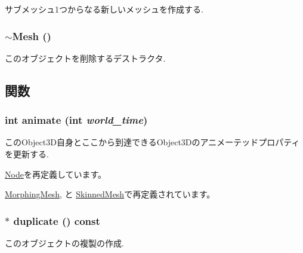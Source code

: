 サブメッシュ1つからなる新しいメッシュを作成する. \hypertarget{classm3g_1_1Mesh_6e26384cfb03023e7dc2e5419baf813f}{
\subsubsection[{$\sim$Mesh}]{\setlength{\rightskip}{0pt plus 5cm}$\sim${\bf Mesh} ()}}
\label{classm3g_1_1Mesh_6e26384cfb03023e7dc2e5419baf813f}


このオブジェクトを削除するデストラクタ. 

\subsection{関数}
\hypertarget{classm3g_1_1Mesh_8aad1ceab4c2a03609c8a42324ce484d}{
\subsubsection[{animate}]{\setlength{\rightskip}{0pt plus 5cm}int animate (int {\em world\_\-time})}}
\label{classm3g_1_1Mesh_8aad1ceab4c2a03609c8a42324ce484d}


このObject3D自身とここから到達できるObject3Dのアニメーテッドプロパティを更新する. 

\hyperlink{classm3g_1_1Node_8aad1ceab4c2a03609c8a42324ce484d}{Node}を再定義しています。

\hyperlink{classm3g_1_1MorphingMesh_8aad1ceab4c2a03609c8a42324ce484d}{MorphingMesh}, と \hyperlink{classm3g_1_1SkinnedMesh_8aad1ceab4c2a03609c8a42324ce484d}{SkinnedMesh}で再定義されています。\hypertarget{classm3g_1_1Mesh_52ce6d0b3eda2bd3a95bfb5b7dbb6f82}{
\subsubsection[{duplicate}]{ $\ast$ duplicate () const}}
\label{classm3g_1_1Mesh_52ce6d0b3eda2bd3a95bfb5b7dbb6f82}


このオブジェクトの複製の作成. 


